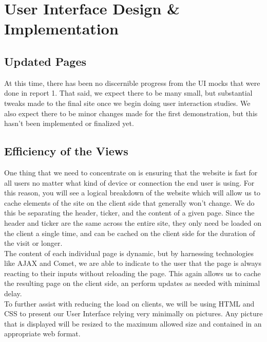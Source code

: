 \chapter{User Interface Design \& Implementation}

\section{Updated Pages}

At this time, there has been no discernible progress from the UI mocks that
were done in report 1.  That said, we expect there to be many small, but
substantial tweaks made to the final site once we begin doing user interaction
studies.  We also expect there to be minor changes made for the first
demonstration, but this hasn't been implemented or finalized yet.\\

\section{Efficiency of the Views}

One thing that we need to concentrate on is ensuring that the website is fast
for all users no matter what kind of device or connection the end user is using.
For this reason, you will see a logical breakdown of the website which will
allow us to cache elements of the site on the client side that generally won't
change.  We do this be separating the header, ticker, and the content of a given
page.  Since the header and ticker are the same across the entire site, they
only need be loaded on the client a single time, and can be cached on the client
side for the duration of the visit or longer.\\

The content of each individual page is dynamic, but by harnessing technologies
like AJAX\cite{wiki:ajax} and Comet\cite{wiki:comt}, we are able to indicate to
the user that the page
is always reacting to their inputs without reloading the page.  This again
allows us to cache the resulting page on the client side, an perform updates
as needed with minimal delay.\\

To further assist with reducing the load on clients, we will be using
HTML\cite{wiki:html} and CSS\cite{wiki:css} to present our User Interface
relying very minimally on pictures.  Any picture that is displayed will be
resized to the maximum allowed size and contained in an appropriate web format.\\

